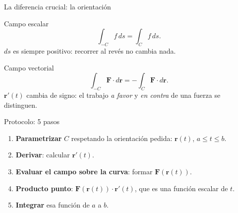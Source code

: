 \documentclass[11pt,aspectratio=169]{beamer}
\begin{document}
\begin{frame}{La diferencia crucial: la orientación}
  \begin{block}{Campo escalar}
    \[
      \int_{-C} f\,ds = \int_C f\,ds.
    \]
    {\small $ds$ es siempre positivo: recorrer al revés no cambia nada.}
  \end{block}
  \pause
  \begin{block}{Campo vectorial}
    \[
      \int_{-C} \mathbf F\cdot d\mathbf r = -\int_C \mathbf F\cdot d\mathbf r.
    \]
    {\small $\mathbf r'(t)$ cambia de signo: el trabajo \emph{a favor} y \emph{en contra} de una fuerza se distinguen.}
  \end{block}
  \pause
\end{frame}

\begin{frame}{Protocolo: 5 pasos}
  \begin{enumerate}
    \setlength{\itemsep}{5pt}
    \item \textbf{Parametrizar} $C$ respetando la orientación pedida: $\mathbf r(t)$, $a\le t\le b$.
    \item \textbf{Derivar}: calcular $\mathbf r'(t)$.
    \item \textbf{Evaluar el campo sobre la curva}: formar $\mathbf F(\mathbf r(t))$.
    \item \textbf{Producto punto}: $\mathbf F(\mathbf r(t))\cdot\mathbf r'(t)$, que es una función escalar de $t$.
    \item \textbf{Integrar} esa función de $a$ a $b$.
  \end{enumerate}
  \vspace{10pt}
  \pause
\end{frame}
\end{document}
